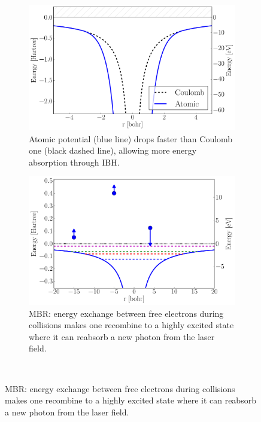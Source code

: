 \begin{figure}
 \centering
    \begin{subfigure}{0.48\columnwidth}
        \centering
        \includegraphics[width=\textwidth]{figures/heating_atomic_potential}
        \caption{Atomic potential (blue line) drops faster than Coulomb one
                (black dashed line), allowing more energy absorption through
                IBH.\\}
        \label{fig:heating:atomic_pot}
    \end{subfigure}
%
    \begin{subfigure}{0.48\columnwidth}
        \centering
        \includegraphics[width=\textwidth]{figures/heating_mbr}
        \caption{MBR: energy exchange between free electrons during collisions
                 makes one recombine to a highly excited state where it can
                 reabsorb a new photon from the laser field.}
        \label{fig:heating:mbr}
    \end{subfigure}
\\

\end{figure}
